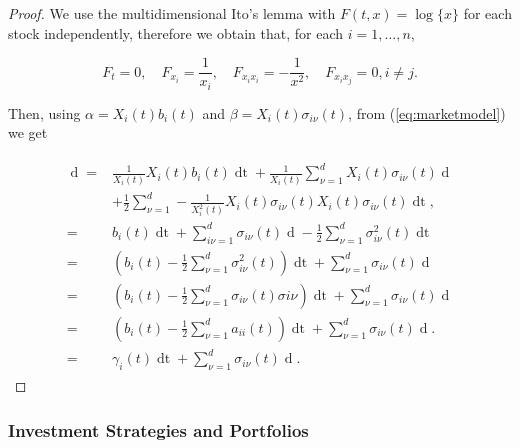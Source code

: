 \documentclass[british]{amsart} \usepackage{lmodern}
\numberwithin{equation}{section} \numberwithin{figure}{section}
\theoremstyle{plain} \newtheorem{thm}{\protect\theoremname}[section]
\theoremstyle{definition} \newtheorem{defn}[thm]{\protect\definitionname}
\theoremstyle{plain} \newtheorem{assumption}[thm]{\protect\assumptionname}
\theoremstyle{plain} \newtheorem{lem}[thm]{\protect\lemmaname}
\theoremstyle{plain} \newtheorem{prop}[thm]{\protect\propositionname}
\theoremstyle{remark} \newtheorem{rem}[thm]{\protect\remarkname}
\theoremstyle{plain} \newtheorem{cor}[thm]{\protect\corollaryname}
\renewcommand{\d}[1]{\mathop{\mathrm{d}{#1}}}
\newcommand{\rangei}{i=1,\dots,n} \newcommand{\measure}{\mathbb{P}}
\begin{document}
\begin{proof}

  We use the multidimensional Ito's lemma with $F(t,x)=\log\{x\}$ for each stock
  independently, therefore we obtain that, for each $\rangei$,

  \begin{equation}
    F_{t}=0, \quad F_{x_{i}}=\frac{1}{x_{i}}, \quad 
    F_{x_{i}x_{i}}=-\frac{1}{x^2}, \quad F_{x_{i}x_{j}}=0, i \neq j.
  \end{equation}

  Then, using $\alpha=X_{i}(t)b_{i}(t)$ and $\beta=X_{i}(t)\sigma_{i\nu}(t)$, 
  from (\ref{eq:marketmodel}) we get

  \begin{gather}
    \begin{split}
    \d{\log{X_{i}(t)}} 
        =& \frac{1}{X_{i}(t)} X_{i}(t)b_{i}(t)\d{t} 
            + \frac{1}{X_{i}(t)} \sum_{\nu=1}^d X_{i}(t)\sigma_{i\nu}(t)\d{W_{\nu}(t)} \\ 
        &
            + \frac{1}{2} \sum_{\nu=1}^d -\frac{1}{X_{i}^2(t)} X_{i}(t)\sigma_{i\nu}(t) X_{i}(t)\sigma_{i\nu}(t) \d{t},\\
        =& b_{i}(t)\d{t} 
            + \sum_{i\nu=1}^d \sigma_{i\nu}(t) \d{W_{\nu}(t)}
            - \frac{1}{2} \sum_{\nu=1}^d \sigma^2_{i\nu}(t) \d{t} \\
        =& \left( b_{i}(t) - \frac{1}{2} \sum_{\nu=1}^d \sigma^2_{i\nu}(t) \right) \d{t} 
            + \sum_{\nu=1}^d \sigma_{i\nu}(t) \d{W_{\nu}(t)}\\
        =& \left( b_{i}(t) - \frac{1}{2} \sum_{\nu=1}^d \sigma_{i\nu}(t) \sigma{i\nu} \right) \d{t} 
            + \sum_{\nu=1}^d \sigma_{i\nu}(t) \d{W_{\nu}(t)}\\
        =& \left( b_{i}(t) - \frac{1}{2} \sum_{\nu=1}^d a_{ii}(t) \right) \d{t} 
            + \sum_{\nu=1}^d \sigma_{i\nu}(t) \d{W_{\nu}(t)}.\\
        =& \gamma_{i}(t) \d{t} + \sum_{\nu=1}^d \sigma_{i\nu}(t) \d{W_{\nu}(t)}.
   \end{split}
  \end{gather}

\end{proof}

\newpage
\subsubsection{Investment Strategies and Portfolios}
\end{document}
